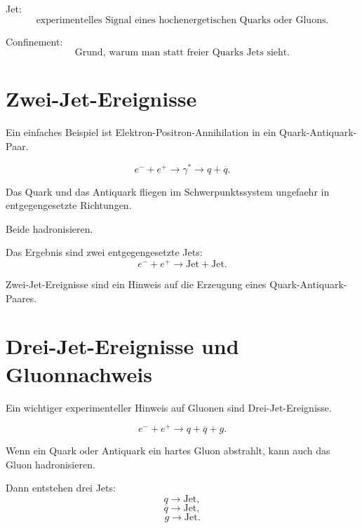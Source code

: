 \begin{examtipbox}
Jet:
\[
    \text{experimentelles Signal eines hochenergetischen Quarks oder Gluons}.
\]

Confinement:
\[
    \text{Grund, warum man statt freier Quarks Jets sieht}.
\]
\end{examtipbox}

\section{Zwei-Jet-Ereignisse}

Ein einfaches Beispiel ist Elektron-Positron-Annihilation in ein Quark-Antiquark-Paar.

\begin{formulabox}
\[
    e^- + e^+
    \rightarrow
    \gamma^*
    \rightarrow
    q+\overline{q}.
\]
\end{formulabox}

\begin{conceptbox}
Das Quark und das Antiquark fliegen im Schwerpunktssystem ungefaehr in entgegengesetzte
Richtungen.

Beide hadronisieren.

Das Ergebnis sind zwei entgegengesetzte Jets:
\[
    e^-+e^+
    \rightarrow
    \text{Jet}+\text{Jet}.
\]
\end{conceptbox}

\begin{examtipbox}
Zwei-Jet-Ereignisse sind ein Hinweis auf die Erzeugung eines Quark-Antiquark-Paares.
\end{examtipbox}

\section{Drei-Jet-Ereignisse und Gluonnachweis}

Ein wichtiger experimenteller Hinweis auf Gluonen sind Drei-Jet-Ereignisse.

\begin{formulabox}
\[
    e^- + e^+
    \rightarrow
    q+\overline{q}+g.
\]
\end{formulabox}

\begin{conceptbox}
Wenn ein Quark oder Antiquark ein hartes Gluon abstrahlt, kann auch das Gluon
hadronisieren.

Dann entstehen drei Jets:
\[
    q \rightarrow \text{Jet},
\]
\[
    \overline{q} \rightarrow \text{Jet},
\]
\[
    g \rightarrow \text{Jet}.
\]
\end{conceptbox}

